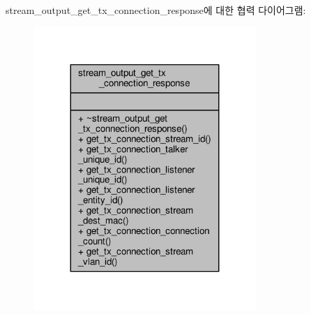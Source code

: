 stream\+\_\+output\+\_\+get\+\_\+tx\+\_\+connection\+\_\+response에 대한 협력 다이어그램\+:
\nopagebreak
\begin{figure}[H]
\begin{center}
\leavevmode
\includegraphics[width=239pt]{classavdecc__lib_1_1stream__output__get__tx__connection__response__coll__graph}
\end{center}
\end{figure}
